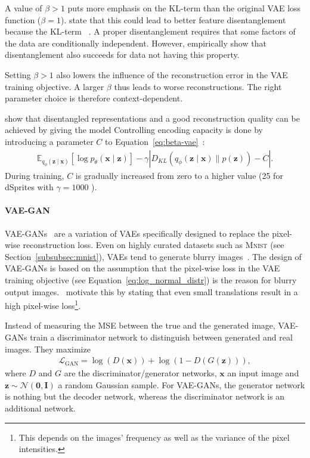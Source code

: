 A value of $\beta > 1$ puts more emphasis on the KL-term than the original \ac{VAE} loss function ($\beta = 1$).
\citet{higgins2017beta} state that this could lead to better feature disentanglement because the KL-term ~\citep{higgins2017beta}.
A proper disentanglement requires that some factors of the data are conditionally independent.
However, \citet{higgins2017beta} empirically show that disentanglement also succeeds for data not having this property.

Setting $\beta > 1$ also lowers the influence of the reconstruction error in the \ac{VAE} training objective.
A larger $\beta$ thus leads to worse reconstructions.
The right parameter choice is therefore context-dependent.

\citet{burgess2018understanding} show that disentangled representations and a good reconstruction quality can be achieved by giving the model 
Controlling encoding capacity is done by introducing a parameter $C$ to Equation~\ref{eq:beta-vae}~\citep{burgess2018understanding}:
\begin{align}
    \mathbb{E}_{q_{\phi}(\mathbf{z} \mid \bm{x})}\left[\log p_{\theta}(\bm{x} \mid \bm{z})\right]-\gamma\left|D_{K L}\left(q_{\phi}(\bm{z} \mid \bm{x}) \| p(\bm{z})\right)-C\right|.
\end{align}
During training, $C$ is gradually increased from zero to a higher value (25 for dSprites with $\gamma=1000$ \citep{burgess2018understanding}).

\paragraph{\ac{VAE}-\ac{GAN}}
\ac{VAE}-\acp{GAN}~\citep{larsen2015autoencoding} are a variation of \acp{VAE} specifically designed to replace the pixel-wise reconstruction loss.
Even on highly curated datasets such as \textsc{Mnist} (see Section~\ref{subsubsec:mnist}), \acp{VAE} tend to generate blurry images~\citep{kingma2014autoencoding}.
The design of \ac{VAE}-\acp{GAN} is based on the assumption that the pixel-wise loss in the \ac{VAE} training objective (see Equation~\ref{eq:log_normal_distr}) is the reason for blurry output images.
\citet{larsen2015autoencoding}~motivate this by stating that even small translations result in a high pixel-wise loss\footnote{This depends on the images' frequency as well as the variance of the pixel intensities.}.

Instead of measuring the \ac{MSE} between the true and the generated image, \ac{VAE}-\acp{GAN} train a discriminator network to distinguish between generated and real images.
They maximize
\begin{align}
    \mathcal{L}_{\mathrm{GAN}}=\log (D(\bm{x}))+\log (1-D(G(\bm{z}))), \label{eq:vae_gan_l_gan}
\end{align}
where $D$ and $G$ are the discriminator/generator networks, $\bm{x}$ an input image and $\bm{z}\sim \mathcal{N}(\bm{0},\bm{I})$ a random Gaussian sample.
For \ac{VAE}-\acp{GAN}, the generator network is nothing but the decoder network, whereas the discriminator network is an additional network.

